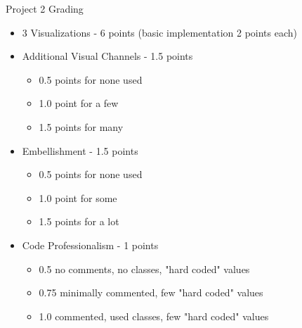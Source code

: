 \documentclass[a4paper,12pt]{article}
\begin{document}
\begin{center}
{\huge Project 2 Grading}
\end{center}

\begin{itemize}
	\item 3 Visualizations - 6 points (basic implementation 2 points each)
	\item Additional Visual Channels - 1.5 points 
		\begin{itemize}
    		\item 0.5 points for none used
    		\item 1.0 point for a few
            \item 1.5 points for many
		\end{itemize}
	\item Embellishment - 1.5 points 
		\begin{itemize}
    		\item 0.5 points for none used
    		\item 1.0 point for some
            \item 1.5 points for a lot
		\end{itemize}
	\item Code Professionalism - 1 points
		\begin{itemize}
            \item 0.5 no comments, no classes, "hard coded" values
            \item 0.75 minimally commented, few "hard coded" values
            \item 1.0 commented, used classes, few "hard coded" values
		\end{itemize}
\end{itemize}
\end{document}
